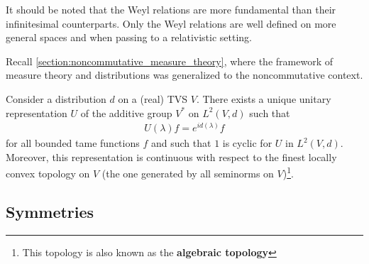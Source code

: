 
    \begin{remark}
        It should be noted that the Weyl relations are more fundamental than their infinitesimal counterparts. Only the Weyl relations are well defined on more general spaces and when passing to a relativistic setting.
    \end{remark}

    Recall \cref{section:noncommutative_measure_theory}, where the framework of measure theory and distributions was generalized to the noncommutative context.
    \begin{property}
        Consider a distribution $d$ on a (real) TVS $V$. There exists a unique unitary representation $U$ of the additive group $V^*$ on $L^2(V,d)$ such that
        \begin{gather}
            U(\lambda)f = e^{id(\lambda)}f
        \end{gather}
        for all bounded tame functions $f$ and such that $1$ is cyclic for $U$ in $L^2(V,d)$. Moreover, this representation is continuous with respect to the finest locally convex topology on $V$ (the one generated by all seminorms on $V$)\footnote{This topology is also known as the \textbf{algebraic topology}}. 
    \end{property}


\subsection{Symmetries}


